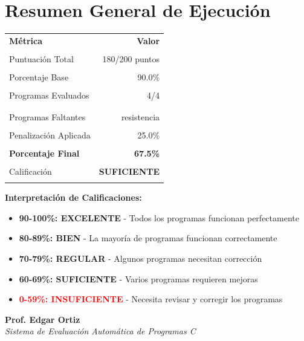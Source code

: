 \documentclass[11pt]{article}
\begin{document}
\vspace{1cm}
\section*{\textbf{Resumen General de Ejecución}}

\begin{center}
\begin{tabular}{l r}
\toprule
\textbf{Métrica} & \textbf{Valor} \\\\
\midrule
Puntuación Total & 180/200 puntos \\\\
Porcentaje Base & 90.0\% \\\\
Programas Evaluados & 4/4 \\\\
\\\midrule
Programas Faltantes & resistencia \\\\
Penalización Aplicada & 25.0\% \\\\
\midrule
\textbf{Porcentaje Final} & \textbf{67.5\%} \\\\
Calificación & \textcolor{scoreorange}{\textbf{SUFICIENTE}} \\\\
\bottomrule
\end{tabular}
\end{center}

\vspace{0.5cm}
\begin{center}
\textbf{Interpretación de Calificaciones:}\\[0.3cm]
\begin{itemize}
\item \textcolor{commentgreen}{\textbf{90-100\%: EXCELENTE}} - Todos los programas funcionan perfectamente
\item \textcolor{commentgreen}{\textbf{80-89\%: BIEN}} - La mayoría de programas funcionan correctamente
\item \textcolor{scoreorange}{\textbf{70-79\%: REGULAR}} - Algunos programas necesitan corrección
\item \textcolor{scoreorange}{\textbf{60-69\%: SUFICIENTE}} - Varios programas requieren mejoras
\item \textcolor{red}{\textbf{0-59\%: INSUFICIENTE}} - Necesita revisar y corregir los programas
\end{itemize}
\end{center}

\vspace{1cm}
\begin{center}
\textbf{Prof. Edgar Ortiz}\\[0.2cm]
\small\textit{Sistema de Evaluación Automática de Programas C}
\end{center}
\end{document}
